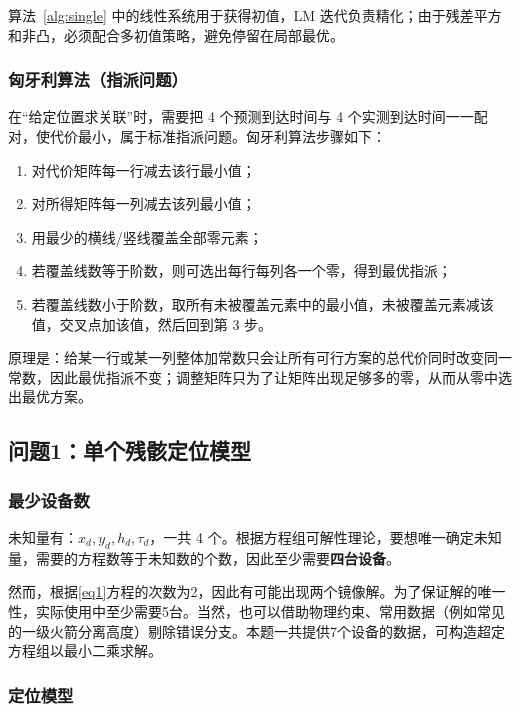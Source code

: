 \documentclass[12pt,a4paper]{article}
\begin{document}
算法~\ref{alg:single} 中的线性系统用于获得初值，LM 迭代负责精化；由于残差平方和非凸，必须配合多初值策略，避免停留在局部最优。

\subsubsection{匈牙利算法（指派问题）}

在“给定位置求关联”时，需要把 4 个预测到达时间与 4 个实测到达时间一一配对，使代价最小，属于标准指派问题。匈牙利算法步骤如下：

\begin{enumerate}[label=\arabic*.]
  \item 对代价矩阵每一行减去该行最小值；
  \item 对所得矩阵每一列减去该列最小值；
  \item 用最少的横线/竖线覆盖全部零元素；
  \item 若覆盖线数等于阶数，则可选出每行每列各一个零，得到最优指派；
  \item 若覆盖线数小于阶数，取所有未被覆盖元素中的最小值，未被覆盖元素减该值，交叉点加该值，然后回到第 3 步。
\end{enumerate}

原理是：给某一行或某一列整体加常数只会让所有可行方案的总代价同时改变同一常数，因此最优指派不变；调整矩阵只为了让矩阵出现足够多的零，从而从零中选出最优方案。

\subsection{问题1：单个残骸定位模型}

\subsubsection{最少设备数}

未知量有：$x_d,y_d,h_d,\tau_d$，一共 4 个。根据方程组可解性理论，要想唯一确定未知量，需要的方程数等于未知数的个数，因此至少需要\textbf{四台设备}。

然而，根据\ref{eq1}方程的次数为2，因此有可能出现两个镜像解。为了保证解的唯一性，实际使用中至少需要5台。当然，也可以借助物理约束、常用数据（例如常见的一级火箭分离高度）剔除错误分支。本题一共提供7个设备的数据，可构造超定方程组以最小二乘求解。

\subsubsection{定位模型}
\end{document}

